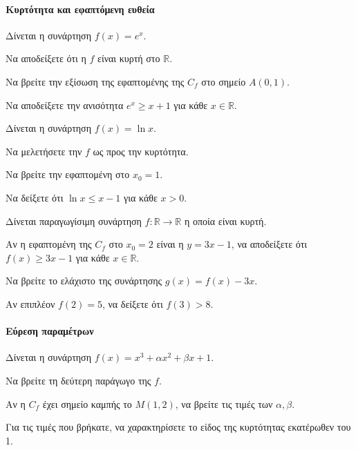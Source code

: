 \documentclass[11pt,a4paper,modern]{FFExercises}
\begin{document}
\paragraph{Κυρτότητα και εφαπτόμενη ευθεία}

\askhsh
Δίνεται η συνάρτηση $f(x) = e^x$.
\begin{alist}
    \item Να αποδείξετε ότι η $f$ είναι κυρτή στο $\mathbb{R}$.
    \item Να βρείτε την εξίσωση της εφαπτομένης της $C_f$ στο σημείο $A(0, 1)$.
    \item Να αποδείξετε την ανισότητα $e^x \ge x+1$ για κάθε $x \in \mathbb{R}$.
\end{alist}

\askhsh
Δίνεται η συνάρτηση $f(x) = \ln x$.
\begin{alist}
    \item Να μελετήσετε την $f$ ως προς την κυρτότητα.
    \item Να βρείτε την εφαπτομένη στο $x_0=1$.
    \item Να δείξετε ότι $\ln x \le x-1$ για κάθε $x>0$.
\end{alist}

\askhsh
Δίνεται παραγωγίσιμη συνάρτηση $f: \mathbb{R} \to \mathbb{R}$ η οποία είναι κυρτή.
\begin{alist}
    \item Αν η εφαπτομένη της $C_f$ στο $x_0=2$ είναι η $y=3x-1$, να αποδείξετε ότι $f(x) \ge 3x-1$ για κάθε $x \in \mathbb{R}$.
    \item Να βρείτε το ελάχιστο της συνάρτησης $g(x) = f(x) - 3x$.
    \item Αν επιπλέον $f(2)=5$, να δείξετε ότι $f(3) > 8$.
\end{alist}

\paragraph{Εύρεση παραμέτρων}

\askhsh
Δίνεται η συνάρτηση $f(x) = x^3 + \alpha x^2 + \beta x + 1$.
\begin{alist}
    \item Να βρείτε τη δεύτερη παράγωγο της $f$.
    \item Αν η $C_f$ έχει σημείο καμπής το $M(1, 2)$, να βρείτε τις τιμές των $\alpha, \beta$.
    \item Για τις τιμές που βρήκατε, να χαρακτηρίσετε το είδος της κυρτότητας εκατέρωθεν του 1.
\end{alist}
\end{document}
